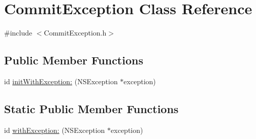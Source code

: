 \hypertarget{interface_commit_exception}{
\section{\-Commit\-Exception \-Class \-Reference}
\label{interface_commit_exception}
}


{\ttfamily \#include $<$\-Commit\-Exception.\-h$>$}

\subsection*{\-Public \-Member \-Functions}
\begin{DoxyCompactItemize}
\item 
id \hyperlink{interface_commit_exception_a2d34529345849ca536260cd09d29cbc1}{init\-With\-Exception\-:} (\-N\-S\-Exception $\ast$exception)
\end{DoxyCompactItemize}
\subsection*{\-Static \-Public \-Member \-Functions}
\begin{DoxyCompactItemize}
\item 
id \hyperlink{interface_commit_exception_a21abfb57fa3bdd78acc84929a2b9a1a1}{with\-Exception\-:} (\-N\-S\-Exception $\ast$exception)
\end{DoxyCompactItemize}


